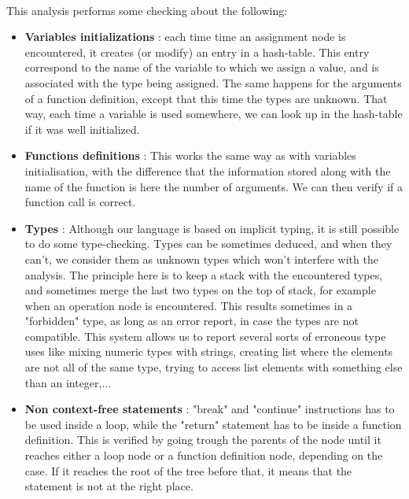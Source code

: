 \documentclass[12pt,a4paper]{article}
\begin{document}
\paragraph{}
This analysis performs some checking about the following:

\begin{itemize}
\item \textbf{Variables initializations} : each time time an assignment node is encountered, it creates (or modify) an entry in a hash-table. This entry correspond to the name of the variable to which we assign a value, and is associated with the type being assigned. The same happens for the arguments of a function definition, except that this time the types are unknown. That way, each time a variable is used somewhere, we can look up in the hash-table if it was well initialized.

\item \textbf{Functions definitions} : This works the same way as with variables initialisation, with the difference that the information stored along with the name of the function is here the number of arguments. We can then verify if a function call is correct. 

\item \textbf{Types} : Although our language is based on implicit typing, it is still possible to do some type-checking. Types can be sometimes deduced, and when they can't, we consider them as unknown types which won't interfere with the analysis. The principle here is to keep a stack with the encountered types, and sometimes merge the last two types on the top of stack, for example when an operation node is encountered. This results sometimes in a "forbidden" type, as long as an error report, in case the types are not compatible. This system allows us to report several sorts of erroneous type uses like mixing numeric types with strings, creating list where the elements are not all of the same type, trying to access list elements with something else than an integer,...  

\item \textbf{Non context-free statements} : "break" and "continue" instructions has to be used inside a loop, while the "return" statement has to be inside a function definition. This is verified by going trough the parents of the node until it reaches either a loop node or a function definition node, depending on the case. If it reaches the root of the tree before that, it means that the statement is not at the right place.
   
\end{itemize}
  
\end{document}
